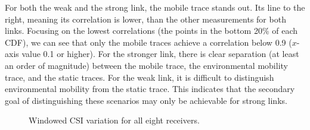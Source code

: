 For both the weak and the strong link, the mobile trace stands out. Its line to the right, meaning its correlation is lower, than the other measurements for both links. Focusing on the lowest correlations (the points in the bottom 20\% of each CDF), we can see that only the mobile traces achieve a correlation below 0.9 ($x$-axis value 0.1 or higher). For the stronger link, there is clear separation (at least an order of magnitude) between the mobile trace, the environmental mobility trace, and the static traces. For the weak link, it is difficult to distinguish environmental mobility from the static trace. This indicates that the secondary goal of distinguishing these scenarios may only be achievable for strong links.

\begin{figure}[htbp]
	\centering
	\hspace{0.03\textwidth}%
	\hspace{0.03\textwidth}%
	\caption{\label{fig:mobility_csi_alllinks_cdf}Windowed CSI variation for all eight receivers.}
\end{figure}

